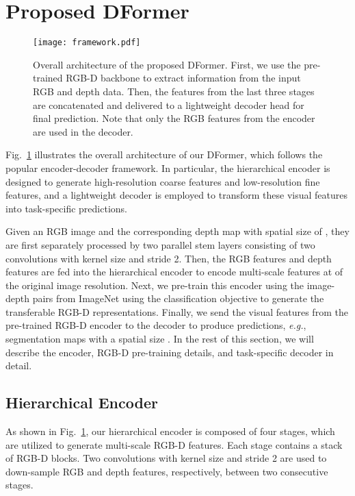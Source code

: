 \documentclass{article}
\newcommand{\figref}[1]{Fig.~\ref{#1}}
\newcommand{\nMethod}{DFormer}
\begin{document}
\section{Proposed \nMethod{}}







\begin{figure}[tp]
\centering
\texttt{[image: framework.pdf]}
\vspace{-15pt}
\caption{\small Overall architecture of the proposed \nMethod{}. 
First, we use the pre-trained RGB-D backbone to extract information from the input RGB and depth data. Then, the features from the last three stages are concatenated and delivered to a lightweight decoder head for final prediction. Note that only the RGB features from the encoder are used in the decoder.
}\label{fig:architecture}
\vspace{-10pt}
\end{figure}

\figref{fig:architecture} illustrates the overall architecture of our \nMethod{}, which follows the popular encoder-decoder framework.
In particular, the hierarchical encoder is designed to generate high-resolution coarse features and low-resolution fine features, and a lightweight decoder is employed to transform these visual features into task-specific predictions.

Given an RGB image and the corresponding depth map with spatial size of , they are first separately processed by two parallel stem layers consisting of two convolutions with kernel size  and stride 2. 
Then, the RGB features and depth features are fed into the hierarchical encoder to encode multi-scale features
at  of the original image resolution.
Next, we pre-train this encoder using the image-depth pairs from ImageNet using the classification objective to generate the transferable RGB-D representations.
Finally, we send the visual features from the pre-trained RGB-D encoder to the decoder to produce predictions, \emph{e.g.}, segmentation maps with a spatial size .
In the rest of this section, we will describe the encoder, RGB-D pre-training details, and task-specific decoder in detail.

\subsection{Hierarchical Encoder}

As shown in \figref{fig:architecture}, our hierarchical encoder is composed of four stages, which are utilized to generate multi-scale RGB-D features.
Each stage contains a stack of RGB-D blocks. 
Two convolutions with kernel size  and stride 2 are used to down-sample RGB and depth features, respectively, between two consecutive stages.
\end{document}

